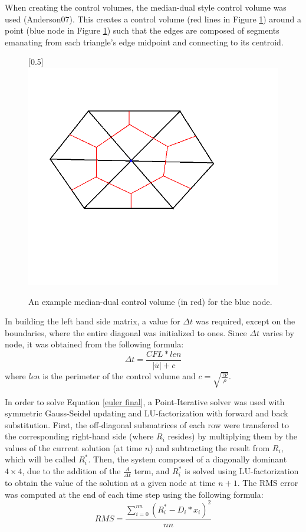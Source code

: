 \documentclass[letterpaper,twoside,11pt,openright,pdf]{book} %
\def\eqstart{\begin{equation}}
\def\eqend{\end{equation}}
\begin{document}
When creating the control volumes, the median-dual style control volume was used (Anderson07).  This creates a control volume (red lines in Figure \ref{fig:md}) around a point (blue node in Figure \ref{fig:md}) such that the edges are composed of segments emanating from each triangle's edge midpoint and connecting to its centroid.

\begin{center}
\begin{figure}[h]
\centering
\scalebox{0.5}[0.5]{\includegraphics{mediandual.png}}
\caption{An example median-dual control volume (in red) for the blue node.}
\label{fig:md}
\end{figure}
\end{center}

In building the left hand side matrix, a value for \(\Delta t\) was required, except on the boundaries, where the entire diagonal was initialized to ones.  Since \(\Delta t\) varies by node, it was obtained from the following formula:
\[ \Delta t = \frac{CFL*len}{|\bar{u}| + c} \]
where \(len\) is the perimeter of the control volume and \(c = \sqrt{\frac{\gamma p}{\rho}}\).

In order to solve Equation \ref{euler final}, a Point-Iterative solver was used with symmetric Gauss-Seidel updating and LU-factorization with forward and back substitution.  First, the off-diagonal submatrices of each row were transfered to the corresponding right-hand side (where \(R_i\) resides) by multiplying them by the values of the current solution (at time \(n\)) and subtracting the result from \(R_i\), which will be called \(R_i^*\).  Then, the system composed of a diagonally dominant \(4\times4\), due to the addition of the \(\frac{A}{\Delta t}\) term, and \(R_i^*\) is solved using LU-factorization to obtain the value of the solution at a given node at time \(n+1\).  The RMS error was computed at the end of each time step using the following formula:
\eqstart
RMS = \frac{\sum_{i=0}^{nn}(R_i^* - D_i*x_i)^2}{nn}
\label{RMS}
\eqend
\end{document}
